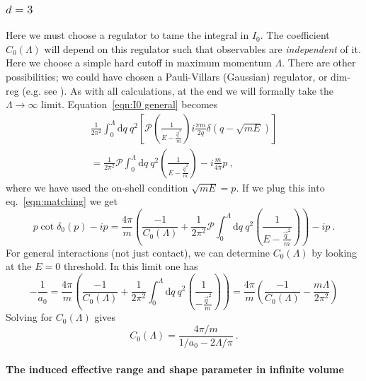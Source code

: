 \documentclass[11pt]{article}
\begin{document}
\subsubsection{$d=3$}
Here we must choose a regulator to tame the integral in $I_0$.  The coefficient $C_0(\Lambda)$ will depend on this regulator such that observables are \emph{independent} of it.  Here we choose a simple hard cutoff in maximum momentum $\Lambda$.  There are other possibilities;  we could have chosen a Pauli-Villars (Gaussian) regulator, or dim-reg (e.g. see \cite{Kaplan:1998we}).  As with all calculations, at the end we will formally take the $\Lambda\to\infty$ limit.  Equation~\eqref{eqn:I0 general} becomes
\begin{multline}
\frac{1}{2\pi^2}\int_0^\Lambda  \mathrm { d } q \ q^2\left[\mathcal{P} \left( \frac { 1 } { E - \frac{\vec{q}^2}{m} } \right)
i\frac{\pi m}{2q}\delta(q-\sqrt{mE})\right]\\
=\frac{1}{2\pi^2}\mathcal{P}\int_0^\Lambda  \mathrm { d } q \ q^2 \left( \frac { 1 } { E - \frac{\vec{q}^2}{m} } \right)
-i\frac{m}{4\pi}p\ ,
\end{multline}
where we have used the on-shell condition $\sqrt{mE}=p$.  If we plug this into eq.~\eqref{eqn:matching} we get
\begin{equation}\label{eqn:matching 2}
p\cot \delta_0(p)-ip=\frac{4\pi}{m}\left(\frac{-1}{C_0(\Lambda)}+\frac{1}{2\pi^2}\mathcal{P}\int_0^\Lambda  \mathrm { d } q \ q^2 \left( \frac { 1 } { E - \frac{\vec{q}^2}{m} } \right)\right)-ip\ .
\end{equation}
For general interactions (not just contact), we can determine $C_0(\Lambda)$ by looking at the $E=0$ threshold.  In this limit one has
\begin{equation}\label{eqn:matching 3}
-\frac{1}{a_0}=\frac{4\pi}{m}\left(\frac{-1}{C_0(\Lambda)}+\frac{1}{2\pi^2}\int_0^\Lambda  \mathrm { d } q \ q^2 \left( \frac { 1 } {  - \frac{\vec{q}^2}{m} } \right)\right)
=\frac{4\pi}{m}\left(\frac{-1}{C_0(\Lambda)}-\frac{m\Lambda}{2\pi^2}\right)
\end{equation}
Solving for $C_0(\Lambda)$ gives
\begin{equation}\label{eqn:C 3}
C_0(\Lambda)=\frac{4\pi/m}{1/a_0-2\Lambda/\pi}\ .
\end{equation}

\paragraph{The induced effective range and shape parameter in infinite volume\\}
\end{document}
